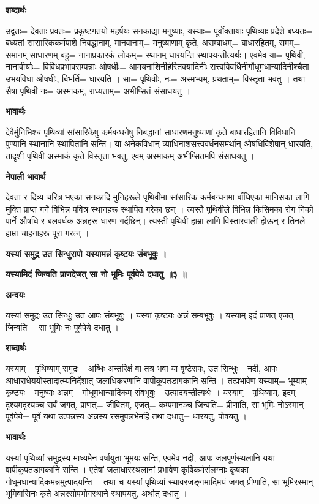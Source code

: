 \documentclass[11pt, a5paper]{article}
\begin{document}
\textbf{शब्दार्थः}

उद्वतः= देवताः प्रवतः= प्रकृष्टगतयो महर्षयः सनकाद्या मनुष्याः, यस्याः= पूर्वोक्तायाः पृथिव्याः प्रदेशे बध्यतः= बध्यतां सासारिककर्मपाशे निबद्धानाम्, मानवानाम्= मनुष्याणाम् कृते, असम्बाधम्= बाधारहितम्, समम्= समानम् साधारणम् बहु= नानाप्रकारकं लोकम्= स्थानम् धारयन्ति स्थापयन्तीत्यर्थः। एवमेव या= पृथिवी, नानावीर्याः= विविधप्रभावसम्पन्नाः ‌ओषधीः= आमयनाशिनीर्हरितक्यादिनीः सत्त्वविवर्धिनीर्गोधूमधान्यादिनीश्चैता उभयविधा ओषधीः, बिभर्ति= धारयति । सा= पृथिवीः, नः= अस्मभ्यम्, प्रथताम्= विस्तृता भवतु । तथा सैषा पृथिवी नः= अस्माकम्, राध्यताम्= अभीप्सितं संसाधयतु ।

\textbf{भावार्थः}

देवैर्मुनिभिश्च पृथिव्यां सांसारिकेषु कर्मबन्धनेषु निबद्धानां साधारणमनुष्याणां कृते बाधारहितानि विविधानि पुण्यानि स्थानानि स्थापितानि सन्ति। या अनेकविधान् व्याधिनाशसत्त्ववर्धनसमर्थान्  ओषधिविशेषान् धारयति, तादृशी पृथिवी अस्माकं कृते विस्तृता भवतु, एवम् अस्माकम् अभीप्सितमपि संसाधयतु ।

\textbf{नेपाली भावार्थ}

देवता र दिव्य चरित्र भएका सनकादि मुनिहरूले पृथिवीमा  सांसारिक कर्मबन्धनमा बाँधिएका मानिसका लागि मुक्ति प्राप्त गर्ने विभिन्न पवित्र स्थानहरू स्थापित गरेका छन् । त्यस्तै पृथिवीले विभिन्न किसिमका रोग निको पार्ने औषधि र बलवर्धक अन्नहरू धारण गर्दछिन्। त्यस्ती पृथिवी हाम्रा लागि विस्तारवाली होऊन् र तिनले हाम्रा चाहनाहरू पूरा गरून् ।

\textbf{यस्यां समुद्र उत सिन्धुरापो यस्यामन्नं कृष्टयः संबभूवुः ।}

\textbf{यस्यामिदं जिन्वति प्राणदेजत् सा नो भूमिः पूर्वपेये दधातु ॥३ ॥}

\textbf{अन्वयः}

यस्यां समुद्रः उत सिन्धुः उत आपः संबभूवुः । यस्यां कृष्टयः अन्नं सम्बभूवुः । यस्याम् इदं प्राणत् एजत् जिन्वति । सा भूमिः नः पूर्वपेये दधातु ।

\textbf{शब्दार्थः}

यस्याम्= पृथिव्याम् समुद्रः= अब्धिः अन्तरिक्षं वा तत्र भवा या वृष्टेरापः, उत सिन्धुः= नदी, आपः= आधाराधेययोस्तादात्म्यनिर्देशात् जलाधिकरणानि वापीकूपतडागकानि सन्ति । तत्प्रभावेण यस्याम्= भूम्याम् कृष्टयः= मनुष्याः अन्नम्= गोधूमधान्यादिकम् संवभूबुः= उत्पादयन्तीत्यर्थः । यस्याम्= पृथिव्याम्, इदम्= दृश्यमदृश्यञ्च सर्वं जगत्, प्राणत्= जीवितम्, एजत्= कम्पमानञ्च जिन्वति= प्रीणाति, सा भूमिः नोऽस्मान् पूर्वपेये= पूर्वं यथा उत्पन्नस्य अन्नस्य रसमुपलभेमहि तथा दधातु= धारयतु, पोषयतु ।

\textbf{भावार्थः}

यस्यां पृथिव्यां समुद्रस्य माध्यमेेन वर्षायुता भूमयः सन्ति, एवमेव नदी, आपः जलपूर्णस्थलानि यथा वापीकूपतडागकानि सन्ति । एतेषां जलाधारस्थलानां प्रभावेण कृषिकर्मसंलग्नाः कृषका गोधूमधान्यादिकमन्नमुत्पादयन्ति । तथा च यस्यां पृथिव्यां स्थावरजङ्गमादिमयं जगत् प्रीणाति, सा भूमिरस्मान् भूमिवासिनः कृते अन्नरसोपभोगस्थाने स्थापयतु, अर्थात् दधातु ।
\end{document}
